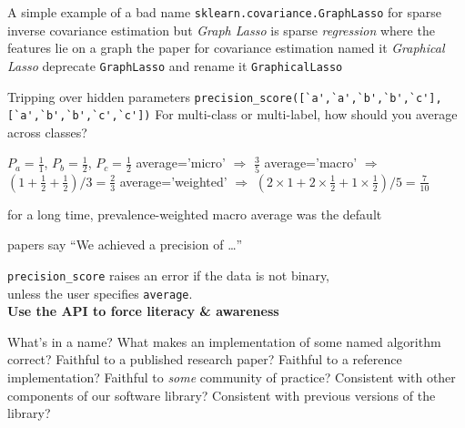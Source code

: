 \documentclass[aspectratio=169, 22pt]{beamer}
\newcommand{\hl}{\textcolor{usydred}}
\begin{document}
\begin{points}{A simple example of a bad name}
	\p \verb|sklearn.covariance.GraphLasso| for sparse inverse covariance estimation
	\p but \emph{Graph Lasso} is sparse \emph{regression} where the features lie on a graph
	\p the paper for covariance estimation named it \emph{Graphical Lasso}
	\pause
	\p[Solution] deprecate \verb|GraphLasso| and rename it \verb|GraphicalLasso|
\end{points}

\begin{points}{Tripping over hidden parameters}
	\p 
\verb|precision_score([`a',`a',`b',`b',`c'], [`a',`b',`b',`c',`c'])|
	\p For multi-class or multi-label, how should you average across classes?
	\begin{itemize}
\p $P_a = \frac{1}{1}$, $P_b = \frac{1}{2}$, $P_c = \frac{1}{2}$
\p average='micro' $\Rightarrow$ $\frac{3}{5}$
\p average='macro' $\Rightarrow$ $(1 + \frac{1}{2} + \frac{1}{2}) / 3 = \frac{2}{3}$
\p average='weighted' $\Rightarrow$ $(2\times1 + 2\times\frac{1}{2} + 1\times\frac{1}{2}) / 5 = \frac{7}{10}$
	\end{itemize}
	\p for a long time, prevalence-weighted macro average was the default
	\begin{itemize}
	\p[$\therefore$] papers say ``We achieved a precision of \dots''
	\end{itemize}
	\pause
\p[Solution] \verb|precision_score| raises an error if the data is not binary,\\
unless the user specifies \verb|average|. \\ \hfill \textbf{\hl{Use the API to force literacy \& awareness}}
\end{points}

\begin{points}{What's in a name?}
	\p What makes an implementation of some named algorithm \hl{correct}?
	\vfill
	\p Faithful to a published research paper?
	\p Faithful to a reference implementation?
	\p Faithful to \emph{some} community of practice?
	\p Consistent with other components of our software library?
	\p Consistent with previous versions of the library?
\end{points}
\end{document}
